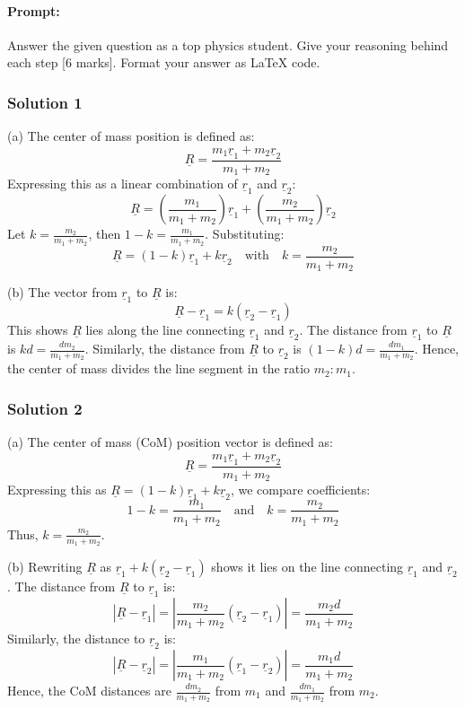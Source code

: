 \documentclass{article}
\begin{document}
\paragraph{Prompt: \\} 
Answer the given question as a top physics student. Give your reasoning behind each step [6 marks].
Format your answer as LaTeX code.

\subsubsection{Solution 1}
(a) The center of mass position is defined as:
\[
\underline{R} = \frac{m_1 \underline{r}_1 + m_2 \underline{r}_2}{m_1 + m_2}
\]
Expressing this as a linear combination of \(\underline{r}_1\) and \(\underline{r}_2\):
\[
\underline{R} = \left(\frac{m_1}{m_1 + m_2}\right)\underline{r}_1 + \left(\frac{m_2}{m_1 + m_2}\right)\underline{r}_2
\]
Let \(k = \frac{m_2}{m_1 + m_2}\), then \(1 - k = \frac{m_1}{m_1 + m_2}\). Substituting:
\[
\underline{R} = (1 - k)\underline{r}_1 + k\underline{r}_2 \quad \text{with} \quad k = \frac{m_2}{m_1 + m_2}
\]

(b) The vector from \(\underline{r}_1\) to \(\underline{R}\) is:
\[
\underline{R} - \underline{r}_1 = k(\underline{r}_2 - \underline{r}_1)
\]
This shows \(\underline{R}\) lies along the line connecting \(\underline{r}_1\) and \(\underline{r}_2\). The distance from \(\underline{r}_1\) to \(\underline{R}\) is \(k d = \frac{d m_2}{m_1 + m_2}\). Similarly, the distance from \(\underline{R}\) to \(\underline{r}_2\) is \((1 - k) d = \frac{d m_1}{m_1 + m_2}\). Hence, the center of mass divides the line segment in the ratio \(m_2 : m_1\).

\subsubsection{Solution 2}
(a) The center of mass (CoM) position vector is defined as:
\[
\underline{R} = \frac{m_1 \underline{r}_1 + m_2 \underline{r}_2}{m_1 + m_2}
\]
Expressing this as \(\underline{R} = (1 - k)\underline{r}_1 + k\underline{r}_2\), we compare coefficients:
\[
1 - k = \frac{m_1}{m_1 + m_2} \quad \text{and} \quad k = \frac{m_2}{m_1 + m_2}
\]
Thus, \(k = \frac{m_2}{m_1 + m_2}\).

(b) Rewriting \(\underline{R}\) as \(\underline{r}_1 + k(\underline{r}_2 - \underline{r}_1)\) shows it lies on the line connecting \(\underline{r}_1\) and \(\underline{r}_2\). The distance from \(\underline{R}\) to \(\underline{r}_1\) is:
\[
|\underline{R} - \underline{r}_1| = \left|\frac{m_2}{m_1 + m_2}(\underline{r}_2 - \underline{r}_1)\right| = \frac{m_2 d}{m_1 + m_2}
\]
Similarly, the distance to \(\underline{r}_2\) is:
\[
|\underline{R} - \underline{r}_2| = \left|\frac{m_1}{m_1 + m_2}(\underline{r}_1 - \underline{r}_2)\right| = \frac{m_1 d}{m_1 + m_2}
\]
Hence, the CoM distances are \(\frac{d m_2}{m_1 + m_2}\) from \(m_1\) and \(\frac{d m_1}{m_1 + m_2}\) from \(m_2\).
\end{document}
